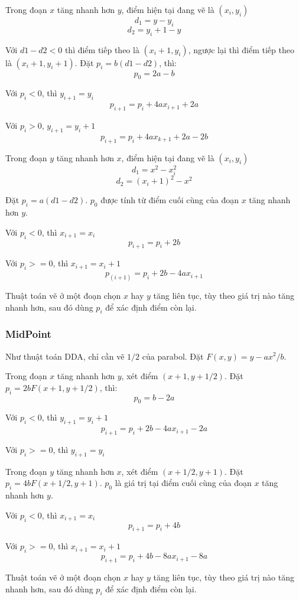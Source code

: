 \documentclass[12pt]{article}
\begin{document}
Trong đoạn \(x\) tăng nhanh hơn \(y\), điểm hiện tại đang vẽ là \((x_i, y_i)\)
\[d_1 = y - y_i\]
\[d_2 = y_i + 1 - y\]

Với \(d1 - d2 < 0\) thì điểm tiếp theo là \((x_i + 1, y_i)\),
ngược lại thì điểm tiếp theo là \((x_i + 1, y_i + 1)\).
Đặt \(p_i = b (d1 - d2)\), thì:
\[p_0 = 2a - b\]

Với \(p_i < 0\), thì \(y_{i+1} = y_i\)
\[p_{i+1} = p_i + 4a x_{i+1} + 2a\]

Với \(p_i > 0\), \(y_{i+1} = y_i + 1\)
\[p_{i+1} = p_i + 4a x_{k+1} + 2a - 2b\]

Trong đoạn \(y\) tăng nhanh hơn \(x\), điểm hiện tại đang vẽ là \((x_i, y_i)\)
\[d_1 = x^2 - x_i^2\]
\[d_2 = (x_i + 1)^2 - x^2\]

Đặt \(p_i = a (d1 - d2)\). \(p_0\) được tính từ điểm cuối cùng của
đoạn \(x\) tăng nhanh hơn \(y\).

Với \(p_i < 0\), thì \(x_{i+1} = x_i\)
\[p_{i+1} = p_i + 2b\]

Với \(p_i >= 0\), thì \(x_{i+1} = x_i + 1\)
\[p_(i+1) = p_i + 2b - 4a x_{i+1}\]

Thuật toán vẽ ở một đoạn chọn \(x\) hay \(y\) tăng liên tục,
tùy theo giá trị nào tăng nhanh hơn,
sau đó dùng \(p_i\) để xác định điểm còn lại.

\subsubsection{MidPoint}
Như thuật toán DDA, chỉ cần vẽ \(1/2\) của parabol.
Đặt \(F(x, y) = y - ax^2/b\).

Trong đoạn \(x\) tăng nhanh hơn \(y\), xét điểm \((x + 1, y + 1/2)\).
Đặt \(p_i = 2b F(x + 1, y + 1/2)\), thì:
\[p_0 = b - 2a\]

Với \(p_i < 0\), thì \(y_{i+1} = y_i + 1\)
\[p_{i+1} = p_i + 2b - 4a x_{i+1} - 2a\]

Với \(p_i >= 0\), thì \(y_{i+1} = y_i\)

Trong đoạn \(y\) tăng nhanh hơn \(x\), xét điểm \((x + 1/2, y + 1)\).
Đặt \(p_i = 4b F(x + 1/2, y + 1)\).
\(p_0\) là giá trị tại điểm cuối cùng của đoạn \(x\) tăng nhanh hơn \(y\).

Với \(p_i < 0\), thì \(x_{i+1} = x_i\)
\[p_{i+1} = p_i + 4b\]

Với \(p_i >= 0\), thì \(x_{i+1} = x_i + 1\)
\[p_{i+1} = p_i + 4b - 8a x_{i+1} - 8a\]

Thuật toán vẽ ở một đoạn chọn \(x\) hay \(y\) tăng liên tục,
tùy theo giá trị nào tăng nhanh hơn,
sau đó dùng \(p_i\) để xác định điểm còn lại.
\end{document}
